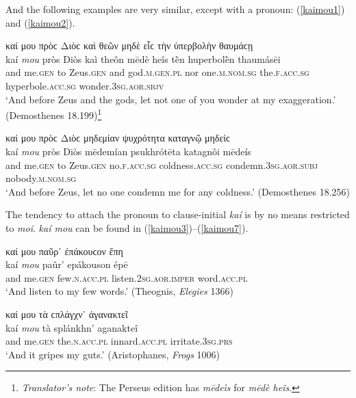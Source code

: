 And the following examples are very similar, except with a  pronoun: (\ref{kaimou1}) and (\ref{kaimou2}).

\begin{exe}
\ex καί μου πρὸϲ Διὸϲ καὶ θεῶν μηδὲ εἷϲ τὴν ὑπερβολὴν θαυμάϲῃ\\
\gll kaí \emph{mou} pròs Diòs kaì theôn mēdè heîs tḕn huperbolḕn thaumásēi\\
and me.\textsc{gen} to Zeus.\textsc{gen} and god.\textsc{m.gen.pl} nor
one\textsc{.m.nom.sg} the.\textsc{f.acc.sg} hyperbole.\textsc{acc.sg}
wonder.\textsc{3sg.aor.sbjv}\\
\trans `And before Zeus and the gods, let not one of you wonder at my exaggeration.' (Demosthenes 18.199)\footnote{\emph{Translator's note}: The Perseus edition has  \textit{mēdeìs} for \textit{mēdè heîs}.}
\label{kaimou1}
\end{exe}

\begin{exe}
\ex καί μου πρὸϲ Διὸϲ μηδεμίαν ψυχρότητα καταγνῷ μηδείϲ\\
\gll kaí \emph{mou} pròs Diòs mēdemían psukhrótēta katagnôi mēdeís\\
and me.\textsc{gen} to Zeus.\textsc{gen} no.\textsc{f.acc.sg}
coldness.\textsc{acc.sg} condemn.\textsc{3sg.aor.subj} nobody.\textsc{m.nom.sg}\\
\trans `And before Zeus, let no one condemn me for any coldness.' (Demosthenes 18.256)
\label{kaimou2}
\end{exe}

The tendency to attach the pronoun to clause-initial \textit{kaí} is by no means restricted to \textit{moi}. \textit{kaí mou} can be found in (\ref{kaimou3})--(\ref{kaimou7}).

\begin{exe}
\ex καί μου παῦρ᾽ ἐπάκουϲον ἔπη\\
\gll kaí \emph{mou} paûr' epákouson épē\\
and me.\textsc{gen} few.\textsc{n.acc.pl} listen.\textsc{2sg.aor.imper} word.\textsc{acc.pl}\\
\trans `And listen to my few words.' (Theognis, \textit{Elegies} 1366)
\label{kaimou3}
\end{exe}

\begin{exe}
\ex καί μου τὰ ϲπλάγχν᾽ ἀγανακτεῖ\\
\gll kaí \emph{mou} tà splánkhn' aganakteî\\
and me.\textsc{gen} the.\textsc{n.acc.pl} innard.\textsc{acc.pl}
irritate.\textsc{3sg.prs}\\
\trans `And it gripes my guts.' (Aristophanes, \textit{Frogs} 1006)
\label{kaimou4}
\end{exe}

